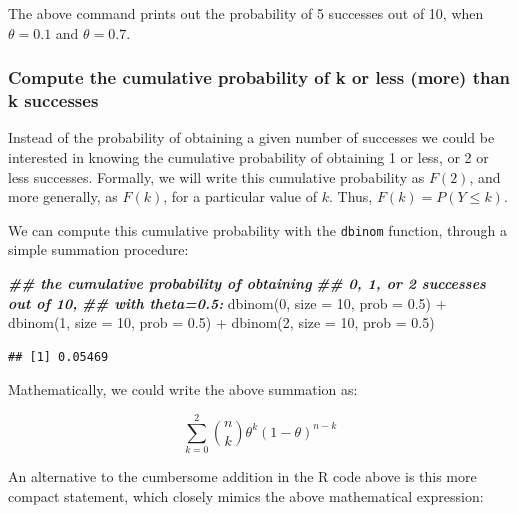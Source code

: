\documentclass[
  12pt,
]{krantz}
\newenvironment{Shaded}{\begin{snugshade}}{\end{snugshade}}
\newcommand{\AttributeTok}[1]{\textcolor[rgb]{0.77,0.63,0.00}{#1}}
\newcommand{\DecValTok}[1]{\textcolor[rgb]{0.00,0.00,0.81}{#1}}
\newcommand{\DocumentationTok}[1]{\textcolor[rgb]{0.56,0.35,0.01}{\textbf{\textit{#1}}}}
\newcommand{\FloatTok}[1]{\textcolor[rgb]{0.00,0.00,0.81}{#1}}
\newcommand{\FunctionTok}[1]{\textcolor[rgb]{0.00,0.00,0.00}{#1}}
\newcommand{\NormalTok}[1]{#1}
\newcommand{\SpecialCharTok}[1]{\textcolor[rgb]{0.00,0.00,0.00}{#1}}
\theoremstyle{definition}
\theoremstyle{definition}
\theoremstyle{definition}
\theoremstyle{definition}
\theoremstyle{remark}
\begin{document}
The above command prints out the probability of 5 successes out of 10, when \(\theta=0.1\) and \(\theta=0.7\).

\hypertarget{compute-the-cumulative-probability-of-k-or-less-more-than-k-successes}{%
\subsubsection{Compute the cumulative probability of k or less (more) than k successes}\label{compute-the-cumulative-probability-of-k-or-less-more-than-k-successes}}

Instead of the probability of obtaining a given number of successes we could be interested in knowing the cumulative probability of obtaining 1 or less, or 2 or less successes. Formally, we will write this cumulative probability as \(F(2)\), and more generally, as \(F(k)\), for a particular value of \(k\). Thus, \(F(k)=P(Y\leq k)\).

We can compute this cumulative probability with the \texttt{dbinom} function, through a simple summation procedure:

\begin{Shaded}
\begin{Highlighting}[]
\DocumentationTok{\#\# the cumulative probability of obtaining}
\DocumentationTok{\#\# 0, 1, or 2 successes out of 10,}
\DocumentationTok{\#\# with theta=0.5:}
\FunctionTok{dbinom}\NormalTok{(}\DecValTok{0}\NormalTok{, }\AttributeTok{size =} \DecValTok{10}\NormalTok{, }\AttributeTok{prob =} \FloatTok{0.5}\NormalTok{) }\SpecialCharTok{+} \FunctionTok{dbinom}\NormalTok{(}\DecValTok{1}\NormalTok{, }\AttributeTok{size =} \DecValTok{10}\NormalTok{, }\AttributeTok{prob =} \FloatTok{0.5}\NormalTok{) }\SpecialCharTok{+}
  \FunctionTok{dbinom}\NormalTok{(}\DecValTok{2}\NormalTok{, }\AttributeTok{size =} \DecValTok{10}\NormalTok{, }\AttributeTok{prob =} \FloatTok{0.5}\NormalTok{)}
\end{Highlighting}
\end{Shaded}

\begin{verbatim}
## [1] 0.05469
\end{verbatim}

Mathematically, we could write the above summation as:

\begin{equation}
\sum_{k=0}^2 \binom{n}{k} \theta^{k} (1-\theta)^{n-k} 
\end{equation}

An alternative to the cumbersome addition in the R code above is this more compact statement, which closely mimics the above mathematical expression:
\end{document}
